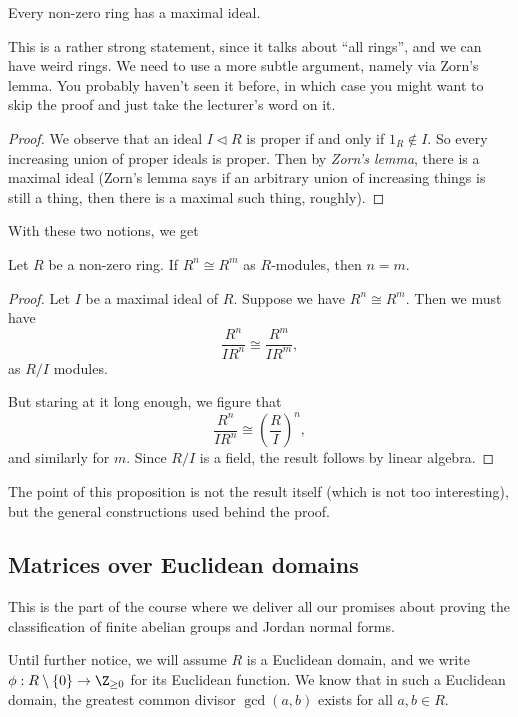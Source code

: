 \documentclass[a4paper]{article}
\begin{document}
\begin{prop}
  Every non-zero ring has a maximal ideal.
\end{prop}
This is a rather strong statement, since it talks about ``all rings'', and we can have weird rings. We need to use a more subtle argument, namely via Zorn's lemma. You probably haven't seen it before, in which case you might want to skip the proof and just take the lecturer's word on it.

\begin{proof}
  We observe that an ideal $I \lhd R$ is proper if and only if $1_R \not\in I$. So every increasing union of proper ideals is proper. Then by \emph{Zorn's lemma}, there is a maximal ideal (Zorn's lemma says if an arbitrary union of increasing things is still a thing, then there is a maximal such thing, roughly).
\end{proof}

With these two notions, we get
\begin{prop}
  Let $R$ be a non-zero ring. If $R^n \cong R^m$ as $R$-modules, then $n = m$.
\end{prop}

\begin{proof}
  Let $I$ be a maximal ideal of $R$. Suppose we have $R^n \cong R^m$. Then we must have
  \[
    \frac{R^n}{IR^n} \cong \frac{R^m}{IR^m},
  \]
  as $R/I$ modules.

  But staring at it long enough, we figure that
  \[
    \frac{R^n}{IR^n} \cong \left(\frac{R}{I}\right)^n,
  \]
  and similarly for $m$. Since $R/I$ is a field, the result follows by linear algebra.
\end{proof}
The point of this proposition is not the result itself (which is not too interesting), but the general constructions used behind the proof.

\subsection{Matrices over Euclidean domains}
This is the part of the course where we deliver all our promises about proving the classification of finite abelian groups and Jordan normal forms.

Until further notice, we will assume $R$ is a Euclidean domain, and we write $\phi: R\setminus \{0\} \to \Z_{\geq 0}$ for its Euclidean function. We know that in such a Euclidean domain, the greatest common divisor $\gcd(a, b)$ exists for all $a, b \in R$.
\end{document}
